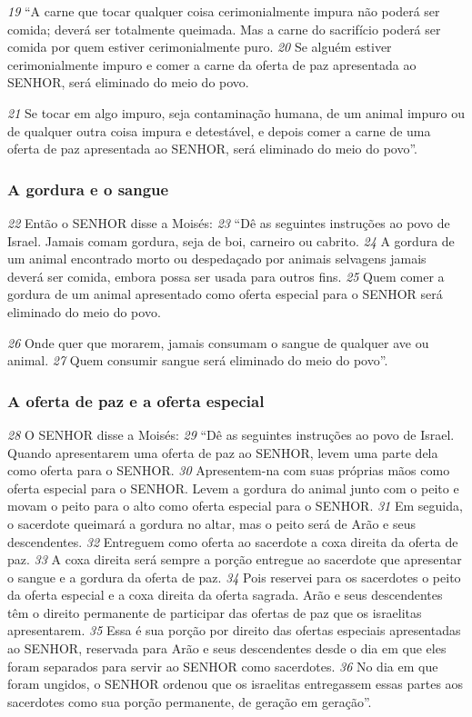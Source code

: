 \smallskip
\textit{\tiny 19}
“A carne que tocar qualquer coisa cerimonialmente impura não poderá ser
comida; deverá ser totalmente queimada. Mas a carne do sacrifício poderá ser
comida por quem estiver cerimonialmente puro. 
\textit{\tiny 20}
Se alguém estiver
cerimonialmente impuro e comer a carne da oferta de paz apresentada ao SENHOR,
será eliminado do meio do povo. 

\smallskip
\textit{\tiny 21}
Se tocar em algo impuro, seja contaminação
humana, de um animal impuro ou de qualquer outra coisa impura e detestável, e
depois comer a carne de uma oferta de paz apresentada ao SENHOR, será
eliminado do meio do povo”.

\bigskip
\subsubsection*{A gordura e o sangue}  
\textit{\tiny 22}
Então o SENHOR disse a Moisés: 
\textit{\tiny 23}
“Dê as seguintes instruções ao povo de Israel.
Jamais comam gordura, seja de boi, carneiro ou cabrito. 
\textit{\tiny 24}
A gordura de um
animal encontrado morto ou despedaçado por animais selvagens jamais deverá
ser comida, embora possa ser usada para outros fins. 
\textit{\tiny 25}
Quem comer a gordura de
um animal apresentado como oferta especial para o SENHOR será eliminado do
meio do povo. 

\smallskip
\textit{\tiny 26}
Onde quer que morarem, jamais consumam o sangue de
qualquer ave ou animal. 
\textit{\tiny 27}
Quem consumir sangue será eliminado do meio do
povo”.

\bigskip
\subsubsection*{A oferta de paz e a oferta especial}  
\textit{\tiny 28}
O SENHOR disse a Moisés: 
\textit{\tiny 29}
“Dê as seguintes instruções ao povo de Israel.
Quando apresentarem uma oferta de paz ao SENHOR, levem uma parte dela como
oferta para o SENHOR. 
\textit{\tiny 30}
Apresentem-na com suas próprias mãos como oferta
especial para o SENHOR. Levem a gordura do animal junto com o peito e movam o
peito para o alto como oferta especial para o SENHOR. 
\textit{\tiny 31}
Em seguida, o sacerdote
queimará a gordura no altar, mas o peito será de Arão e seus descendentes.
\textit{\tiny 32}
Entreguem como oferta ao sacerdote a coxa direita da oferta de paz. 
\textit{\tiny 33}
A coxa
direita será sempre a porção entregue ao sacerdote que apresentar o sangue e a
gordura da oferta de paz. 
\textit{\tiny 34}
Pois reservei para os sacerdotes o peito da oferta
especial e a coxa direita da oferta sagrada. Arão e seus descendentes têm o direito
permanente de participar das ofertas de paz que os israelitas apresentarem.
\textit{\tiny 35}
Essa é sua porção por direito das ofertas especiais apresentadas ao SENHOR,
reservada para Arão e seus descendentes desde o dia em que eles foram
separados para servir ao SENHOR como sacerdotes. 
\textit{\tiny 36}
No dia em que foram
ungidos, o SENHOR ordenou que os israelitas entregassem essas partes aos
sacerdotes como sua porção permanente, de geração em geração”.
   
